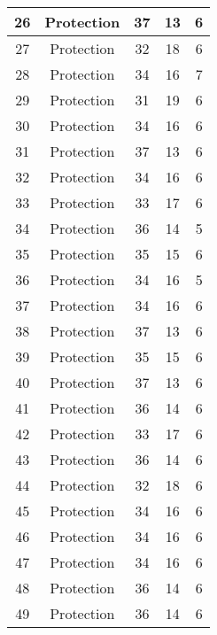 \documentclass[results.tex]{subfiles}
\begin{document}
\begin{center}
\begin{tabular}{| c || c | c | c | c |}
    \hline
    26 & Protection & 37 & 13 & 6 \\ 
    \hline
    27 & Protection & 32 & 18 & 6 \\ 
    \hline
    28 & Protection & 34 & 16 & 7 \\ 
    \hline
    29 & Protection & 31 & 19 & 6 \\ 
    \hline
    30 & Protection & 34 & 16 & 6 \\ 
    \hline
    31 & Protection & 37 & 13 & 6 \\ 
    \hline
    32 & Protection & 34 & 16 & 6 \\ 
    \hline
    33 & Protection & 33 & 17 & 6 \\ 
    \hline
    34 & Protection & 36 & 14 & 5 \\ 
    \hline
    35 & Protection & 35 & 15 & 6 \\ 
    \hline
    36 & Protection & 34 & 16 & 5 \\ 
    \hline
    37 & Protection & 34 & 16 & 6 \\ 
    \hline
    38 & Protection & 37 & 13 & 6 \\ 
    \hline
    39 & Protection & 35 & 15 & 6 \\ 
    \hline
    40 & Protection & 37 & 13 & 6 \\ 
    \hline
    41 & Protection & 36 & 14 & 6 \\ 
    \hline
    42 & Protection & 33 & 17 & 6 \\ 
    \hline
    43 & Protection & 36 & 14 & 6 \\ 
    \hline
    44 & Protection & 32 & 18 & 6 \\ 
    \hline
    45 & Protection & 34 & 16 & 6 \\ 
    \hline
    46 & Protection & 34 & 16 & 6 \\ 
    \hline
    47 & Protection & 34 & 16 & 6 \\ 
    \hline
    48 & Protection & 36 & 14 & 6 \\ 
    \hline
    49 & Protection & 36 & 14 & 6 \\ 
    \hline   \end{tabular}
\end{center}
\end{document}
